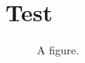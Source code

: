 \documentclass[../main.tex]{subfiles}
\begin{document}
\chapter{Test}
\begin{figure}
    \centering
    
    \caption{A figure.}
    \label{fig:fig}
\end{figure}
\end{document}
